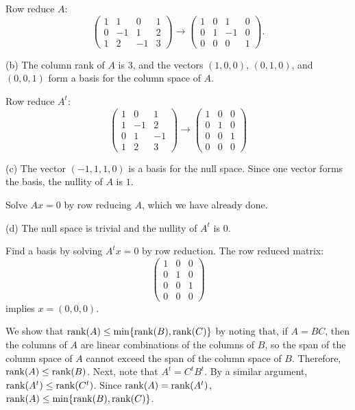 \documentclass{ximera}
\begin{document}
\soln Row reduce $A$:
\[
\left(\begin{array}{rrrr} 1 & 1 & 0 & 1 \\ 0 & -1 & 1 & 2 \\1 & 2
& -1 & 3 \end{array}\right) \longrightarrow \left(\begin{array}{rrrr}
1 & 0 & 1 & 0 \\ 0 & 1 & -1 & 0 \\0 & 0 & 0 & 1 \end{array}\right).
\]

(b) \ans The column rank of $A$ is $3$, and the vectors $(1,0,0)$,
$(0,1,0)$, and $(0,0,1)$ form a basis for the column space of $A$.

\soln Row reduce $A^t$:
\[
\left(\begin{array}{rrr} 1 & 0 & 1 \\ 1 & -1 & 2 \\ 0 & 1 & -1
\\ 1 & 2 & 3 \end{array}\right) \longrightarrow \left(\begin{array}{rrr}
1 & 0 & 0 \\ 0 & 1 & 0 \\ 0 & 0 & 1 \\ 0 & 0 & 0 \end{array}\right)
\]

(c) \ans The vector $(-1,1,1,0)$ is a basis for the null space.  Since one
vector forms the basis, the nullity of $A$ is $1$.  

\soln Solve $Ax = 0$ by row reducing $A$, which we have already done.

(d) \ans The null space is trivial and the nullity of $A^t$ is $0$.

\soln Find a basis by solving $A^tx = 0$ by row reduction.  The row
reduced matrix:
\[
\left(\begin{array}{rrr} 1 & 0 & 0 \\ 0 & 1 & 0 \\ 0 & 0 & 1
\\ 0 & 0 & 0 \end{array}\right)
\]
implies $x = (0,0,0)$.

We show that ${\rm rank}(A) \leq \min\{{\rm rank}(B),{\rm rank}(C)\}$ by noting that,
if $A = BC$, then the columns of $A$ are linear combinations of the
columns of $B$, so the span of the column space of $A$ cannot exceed
the span of the column space of $B$.  Therefore, ${\rm rank}(A) \leq
{\rm rank}(B)$.  Next, note that $A^t = C^tB^t$.  By a similar argument,
${\rm rank}(A^t) \leq {\rm rank}(C^t)$.  Since ${\rm rank}(A) = {\rm rank}(A^t)$,
${\rm rank}(A) \leq \min\{{\rm rank}(B),{\rm rank}(C)\}$.
\end{document}
